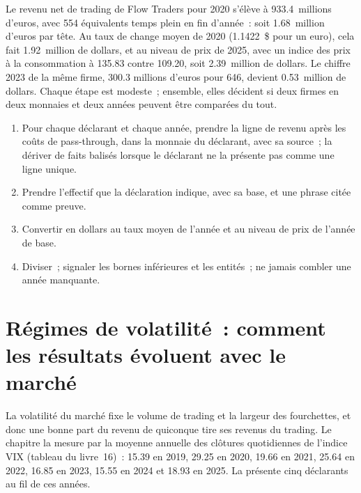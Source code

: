 \begin{example}\label{ex:in:revenue-and-profit-across-the-industry:cell}
Le revenu net de trading de Flow Traders pour 2020 s'élève à 933.4~millions d'euros, avec 554 équivalents temps plein en fin d'année~:
soit 1.68~million d'euros par tête. Au taux de change moyen de 2020 (1.1422~\$ pour un euro), cela fait 1.92~million de dollars, et au niveau de prix de 2025,
avec un indice des prix à la consommation à 135.83 contre 109.20, soit 2.39~million de dollars. Le chiffre 2023 de la même firme, 300.3
millions d'euros pour 646, devient 0.53~million de dollars. Chaque étape est modeste~; ensemble, elles décident si deux firmes en deux monnaies et deux années
peuvent être comparées du tout.
\end{example}

\begin{method}\label{met:in:revenue-and-profit-across-the-industry:table}
\begin{enumerate}
\item Pour chaque déclarant et chaque année, prendre la ligne de revenu après les coûts de pass-through, dans la monnaie du déclarant, avec sa
source~; la dériver de faits balisés lorsque le déclarant ne la présente pas comme une ligne unique.
\item Prendre l'effectif que la déclaration indique, avec sa base, et une phrase citée comme preuve.
\item Convertir en dollars au taux moyen de l'année et au niveau de prix de l'année de base.
\item Diviser~; signaler les bornes inférieures et les entités~; ne jamais combler une année manquante.
\end{enumerate}
\end{method}

\section{Régimes de volatilité~: comment les résultats évoluent avec le marché}

La volatilité du marché fixe le volume de trading et la largeur des fourchettes, et donc une bonne part du revenu de
quiconque tire ses revenus du trading. Le chapitre la mesure par la moyenne annuelle des clôtures quotidiennes de l'indice VIX (tableau du
livre~16)~: 15.39 en 2019, 29.25 en 2020, 19.66 en 2021, 25.64 en 2022, 16.85 en 2023, 15.55 en 2024 et 18.93 en 2025.
La  présente cinq déclarants au fil de ces années.

